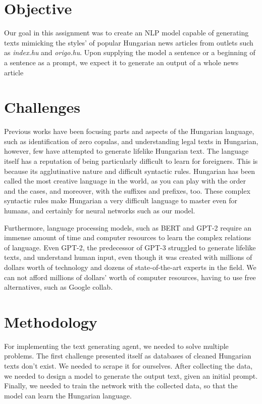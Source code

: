 \documentclass[journal]{IEEEtai}
\begin{document}
\section{Objective}
Our goal in this assignment was to create an NLP model capable of generating texts mimicking  the styles' of popular Hungarian news articles from outlets such as {\it index.hu} and {\it origo.hu}. Upon supplying the model a sentence or a beginning of a sentence as a prompt, we expect it to generate an output of a whole news article

\section{Challenges}
Previous works have been focusing parts and aspects of the Hungarian language, such as identification of zero copulas\cite{Dmtr2020MuchAA}, and understanding legal texts in Hungarian\cite{gorog2019legal}, however, few have attempted to generate lifelike Hungarian text. The language itself has a reputation of being particularly difficult to learn for foreigners. This is because its agglutinative nature and difficult syntactic rules. Hungarian has been called the most creative language in the world, as you can play with the order and the cases, and moreover, with the suffixes and prefixes, too. These complex syntactic rules make Hungarian a very difficult language to master even for humans, and certainly for neural networks such as our model.

Furthermore, language processing models, such as BERT and GPT-2 require an immense amount of time and computer resources to learn the complex relations of language. Even GPT-2, the predecessor of GPT-3 struggled to generate lifelike texts, and understand human input, even though it was created with millions of dollars worth of technology and dozens of state-of-the-art experts in the field. We can not afford millions of dollars' worth of computer resources, having to use free alternatives, such as Google collab.


\section{Methodology}
For implementing the text generating agent, we needed to solve multiple problems. The first challenge presented itself as databases of cleaned Hungarian texts don't exist. We needed to scrape it for ourselves. After collecting the data, we needed to design a model to generate the output text, given an initial prompt. Finally, we needed to train the network with the collected data, so that the model can learn the Hungarian language.  
\end{document}

